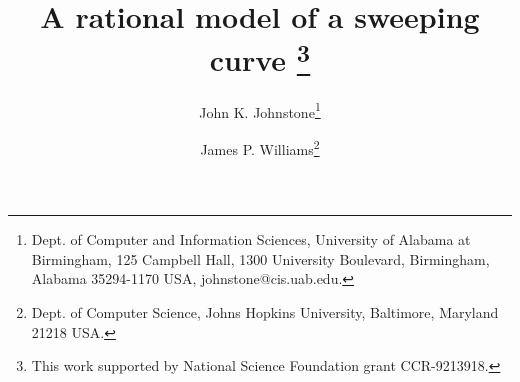 \newcommand{\SingleSpace}{\edef\baselinestretch{0.9}\Large\normalsize}
\newcommand{\DoubleSpace}{\edef\baselinestretch{1.4}\Large\normalsize}
\newcommand{\Comment}[1]{\relax}  %
\newcommand{\Heading}[1]{\par\noindent{\bf#1}\nobreak}
\newcommand{\Tail}[1]{\nobreak\par\noindent{\bf#1}}
\newcommand{\QED}{\vrule height 1.4ex width 1.0ex depth -.1ex\ } %
\newcommand{\arc}[1]{\mbox{$\stackrel{\frown}{#1}$}}
\newcommand{\lyne}[1]{\mbox{$\stackrel{\leftrightarrow}{#1}$}}
\newcommand{\ray}[1]{\mbox{$\vec{#1}$}}          
\newcommand{\seg}[1]{\mbox{$\overline{#1}$}}
\newcommand{\tab}{\hspace*{.2in}}
\newcommand{\se}{\mbox{$_{\epsilon}$}}  %
\newcommand{\ie}{\mbox{i.e.}}
\newcommand{\eg}{\mbox{e.\ g.\ }}
\newcommand{\figg}[3]{\begin{figure}[htbp]\vspace{#3}\caption{#2}\label{#1}\end{figure}}
\newcommand{\be}{\begin{equation}}
\newcommand{\ee}{\end{equation}}
\newcommand{\prf}{\noindent{{\bf Proof} :\ }}
\newcommand{\choice}[2]{\left( \begin{array}{c} \mbox{\footnotesize{$#1$}} \\ \mbox{\footnotesize{$#2$}} \end{array} \right)}      
\newcommand{\ddt}{\frac{\partial}{\partial t}}

\newtheorem{rmk}{Remark}[section]
\newtheorem{example}{Example}[section]
\newtheorem{conjecture}{Conjecture}[section]
\newtheorem{claim}{Claim}[section]
\newtheorem{notation}{Notation}[section]
\newtheorem{lemma}{Lemma}[section]
\newtheorem{theorem}{Theorem}[section]
\newtheorem{corollary}{Corollary}[section]
\newtheorem{defn2}{Definition}

\ifFull                                          
\SingleSpace
\else
\DoubleSpace
\fi

\setlength{\oddsidemargin}{0pt}
\setlength{\evensidemargin}{0pt}
\setlength{\headsep}{0pt}
\setlength{\topmargin}{0pt}
\setlength{\textheight}{8.75in}
\setlength{\textwidth}{6.5in}
\setlength{\headsep}{.2in}

\title{
A rational model of a sweeping curve
        \thanks{This work supported by National Science Foundation grant
        CCR-9213918.}}
\author{John K. Johnstone\thanks{Dept. of Computer and Information 
	Sciences,
	University of Alabama at Birmingham,
	125 Campbell Hall, 1300 University Boulevard,
	Birmingham, Alabama  35294-1170 USA, johnstone@cis.uab.edu.}
 	\and James P. Williams\thanks{Dept. of Computer Science,
 	Johns Hopkins University, Baltimore, Maryland 21218 USA.}}


